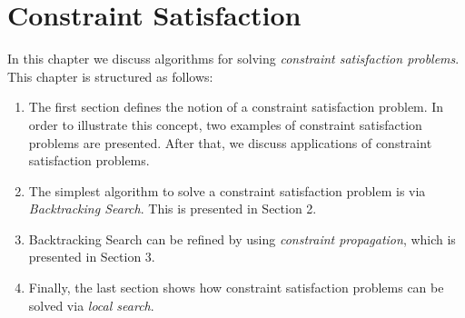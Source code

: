 \chapter{Constraint Satisfaction}
In this chapter we discuss algorithms for solving \emph{\color{blue}constraint satisfaction problems}.
This chapter is structured as follows:
\begin{enumerate}
\item The first section defines the notion of a constraint satisfaction problem.  In order to illustrate this
      concept, two examples of constraint satisfaction problems are presented.  After that, we discuss
      applications of constraint satisfaction problems.
\item The simplest algorithm to solve a constraint satisfaction problem is via \emph{\color{blue}Backtracking Search}.
      This is presented in Section 2.
\item Backtracking Search can be refined by using \emph{\color{blue}constraint propagation}, which is presented in
      Section 3.
\item Finally, the last section shows how constraint satisfaction problems can be solved via
      \emph{\color{blue}local search}.
\end{enumerate}

